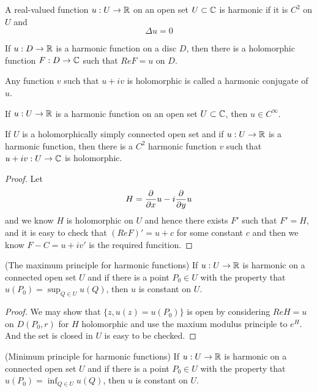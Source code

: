 \begin{definition}
    A real-valued function $u:U\to\mathbb{R}$ on an open set $U\subset \mathbb{C}$ is harmonic if it is $C^2$ on $U$ and
    \[\Delta u = 0\]
\end{definition}

\begin{lemma}
    If $u:D\to \mathbb{R}$ is a harmonic function on a disc $D$, then there is a holomorphic function $F:D\to\mathbb{C}$ such that $Re F = u$ on $D$.
\end{lemma}

\begin{definition}
    Any function $v$ such that $u+iv$ is holomorphic is called a harmonic conjugate of $u$.
\end{definition}

\begin{corollary}
    If $u:U\to\mathbb{R}$ is a harmonic function on an open set $U\subset\mathbb{C}$, then $u\in C^{\infty}$.
\end{corollary}

\begin{lemma}
    If $U$ is a holomorphically simply connected open set and if $u:U\to\mathbb{R}$ is a harmonic function, then there is a $C^2$ harmonic function $v$ such that $u+iv:U\to \mathbb{C}$ is holomorphic.
\end{lemma}
\begin{proof}
    Let
    \[H = \dfrac{\partial}{\partial x} u - i \dfrac{\partial}{\partial y} u\]
    and we know $H$ is holomorphic on $U$ and hence  there exists $F'$ such that $F' = H$, and it is easy to check that $(ReF) ' = u+c$ for some constant $c$ and then we know $F-C = u + iv'$ is the required funcition.
\end{proof}

\begin{theorem}
    (The maximum principle for harmonic functions) If $u:U\to\mathbb{R}$ is harmonic on a connected open set $U$ and if there is a point $P_0 \in U$ with the property that $u(P_0) = \sup_{Q\in U}u(Q)$, then $u$ is constant on $U$.
\end{theorem}
\begin{proof}
    We may show that $\{z, u(z) = u(P_0)\}$ is open by considering $ReH = u$ on $D(P_0,r)$ for $H$ holomorphic and use the maxium modulus principle to $e^H$. And the set is closed in $U$ is easy to be checked.
\end{proof}

\begin{corollary}
    (Minimum principle for harmonic functions) If $u:U\to\mathbb{R}$ is harmonic on a connected open set $U$ and if there is a point $P_0 \in U$ with the property that $u(P_0) = \inf_{Q\in U}u(Q)$, then $u$ is constant on $U$.
\end{corollary}

